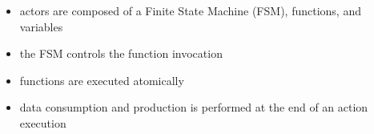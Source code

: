 \begin{frame}[t]
\begin{overlayarea}{\textwidth}{3cm}
\end{overlayarea}

\end{frame}






\begin{frame}
\begin{figure}
\centering
\resizebox{0.7\columnwidth}{!}{}
\end{figure}
\begin{itemize}
\item actors are composed of a Finite State Machine (FSM), functions, and variables
\item the FSM controls the function invocation
\item functions are executed atomically
\item data consumption and production is performed at the end of an action execution
\end{itemize}
\end{frame}







